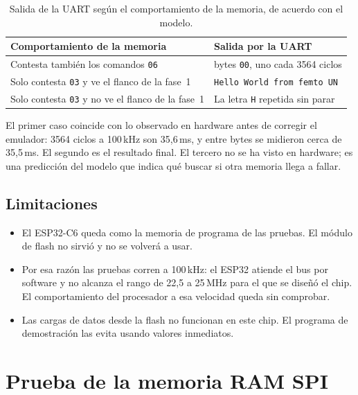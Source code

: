\documentclass[11pt,letterpaper,oneside]{report}
\newcommand{\code}[1]{\texttt{#1}}
\begin{document}
\begin{table}[htbp]
\centering
\caption{Salida de la UART según el comportamiento de la memoria, de acuerdo con el modelo.}
\label{tab:modelo}
\begin{tabular}{>{\raggedright\arraybackslash}p{7.4cm} >{\raggedright\arraybackslash}p{6.6cm}}
\toprule
\textbf{Comportamiento de la memoria} & \textbf{Salida por la UART} \\
\midrule
Contesta también los comandos \code{06} & 27 bytes \code{00}, uno cada 3564 ciclos \\
Solo contesta \code{03} y ve el flanco de la fase~1 & \code{Hello World from femto UN} \\
Solo contesta \code{03} y no ve el flanco de la fase~1 & La letra \code{H} repetida sin parar \\
\bottomrule
\end{tabular}
\end{table}

El primer caso coincide con lo observado en hardware antes de corregir el emulador: 3564 ciclos a 100\,kHz son 35,6\,ms, y entre bytes se midieron cerca de 35,5\,ms. El segundo es el resultado final. El tercero no se ha visto en hardware; es una predicción del modelo que indica qué buscar si otra memoria llega a fallar.

\section{Limitaciones}

\begin{itemize}
  \item El ESP32-C6 queda como la memoria de programa de las pruebas. El módulo de flash no sirvió y no se volverá a usar.
  \item Por esa razón las pruebas corren a 100\,kHz: el ESP32 atiende el bus por software y no alcanza el rango de 22,5 a 25\,MHz para el que se diseñó el chip. El comportamiento del procesador a esa velocidad queda sin comprobar.
  \item Las cargas de datos desde la flash no funcionan en este chip. El programa de demostración las evita usando valores inmediatos.
\end{itemize}

\chapter{Prueba de la memoria RAM SPI}
\label{cap:ram}
\end{document}
